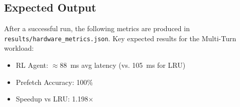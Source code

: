 \documentclass[conference]{IEEEtran}
\begin{document}
\subsection{Expected Output}

After a successful run, the following metrics are produced in \texttt{results/hardware\_metrics.json}. Key expected results for the Multi-Turn workload:
\begin{itemize}
    \item RL Agent: $\approx$88~ms avg latency (vs. 105~ms for LRU)
    \item Prefetch Accuracy: 100\%
    \item Speedup vs LRU: 1.198$\times$
\end{itemize}
\end{document}
